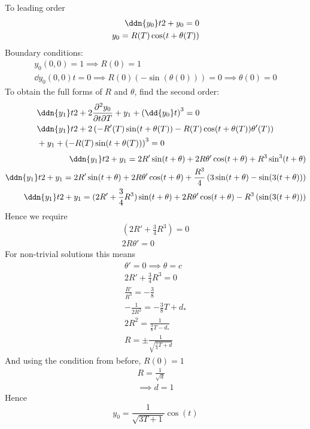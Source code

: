 \documentclass{X:/Documents/Coding/Latex/myassignment}
\begin{document}
\begin{enumerate}
	To leading order
	\begin{align*}
		\ddn{y_0} t2  + y_0 =0 \\
		y_0 = R(T)\cos( t + \theta(T))
	\end{align*}
	Boundary conditions:
	\begin{align*}
		y_0(0,0) = 1 \implies R(0) = 1\\
		\dd{y_0(0,0)}{ t} = 0 \implies R(0)(-\sin(\theta(0))) =0 \implies \theta(0) = 0
	\end{align*}
	To obtain the full forms of $R$ and $\theta$, find the second order:
	\begin{align*}
		&\ddn{y_1} t2 + 2\frac{\partial^2y_0}{\partial t \partial T}  + y_1 + \left(\dd{y_0} t\right)^3 =0 \\
		&\ddn{y_1} t2 + 2\left(-R'(T)\sin(t+\theta(T)) -R(T)\cos(t+\theta(T))\theta'(T)  \right) \\& + y_1 + \left(-R(T)\sin(t + \theta(T))\right)^3 =0 \\
	\end{align*}
	\begin{align*}
		\ddn{y_1} t2 + y_1 = 2R'\sin(t + \theta) + 2R\theta' \cos(t + \theta) + R^3 \sin^3(t +\theta)\\
		\ddn{y_1} t2 + y_1 = 2R'\sin(t + \theta) + 2R\theta' \cos(t + \theta) + \frac{R^3}{4} \left(3\sin(t +\theta) - \sin(3(t +\theta))\right)\\
		\ddn{y_1} t2 + y_1 = (2R'+\frac{3}{4}R^3)\sin(t + \theta) + 2R\theta' \cos(t + \theta) - R^3 \left(\sin(3(t +\theta))\right)\\
	\end{align*}
	Hence we require
	\begin{align*}
		(2R'+\frac34R^3) = 0\\
		2R\theta' = 0
	\end{align*}
	For non-trivial solutions this means
	\begin{align*}
		\theta ' =0 \implies \theta = c\\
		2R' + \frac34R^3 = 0 \\
		\frac{R'}{R^3} = - \frac38\\
		-\frac{1}{2R^2} = - \frac38 T + d_*\\
		2R^2 = \frac{1}{\frac38 T -d_*}\\
		R = \pm\frac{1}{\sqrt{\frac34T + d}}
	\end{align*}
	And using the condition from before, $R(0) = 1$
	\begin{align*}
		R = \frac{1}{\sqrt{d}}\\
		\implies d = 1
	\end{align*}
	Hence
	\[\boxed{y_0 = \frac{1}{\sqrt{3T + 1}}\cos(t)}\]


\end{enumerate}
\end{document}
